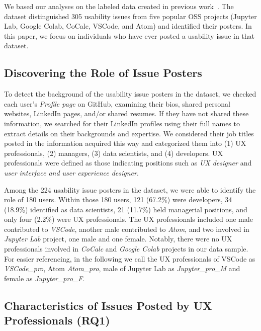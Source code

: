 We based our analyses on the labeled data created in previous work~\cite{sanei2023characterizing}. The dataset distinguished 305 usability issues from five popular OSS projects (Jupyter Lab,
Google Colab, CoCalc, VSCode, and Atom) and identified their posters. In this paper, we focus on individuals who have ever posted a usability issue in that dataset. 

\subsection{Discovering the Role of Issue Posters}\label{sec: Discovering_role}

To detect the background of the usability issue posters in the dataset, we checked each user's \textit{Profile page} on GitHub, examining their bios, shared personal websites, LinkedIn pages, and/or shared resumes. If they have not shared these information, we searched for their LinkedIn profiles using their full names to extract details on their backgrounds and expertise. We considered their job titles posted in the information acquired this way and categorized them into (1) UX professionals, (2) managers, (3) data scientists, and (4) developers. UX professionals were defined as those indicating positions such as \textit{UX designer} and \textit{user interface and user experience designer}.

Among the 224 usability issue posters in the dataset, we were able to identify the role of 180 users. Within those 180 users, 121 (67.2\%) were developers, 34 (18.9\%) identified as data scientists, 21 (11.7\%) held managerial positions, and only four (2.2\%) were UX professionals. The UX professionals included one male contributed to \textit{VSCode}, another male contributed to \textit{Atom}, and two involved in \textit{Jupyter Lab} project, one male and one female. Notably, there were no UX professionals involved in \textit{CoCalc} and \textit{Google Colab} projects in our data sample. For easier referencing, in the following we call the UX professionals of VSCode as \textit{VSCode\_pro}, Atom \textit{Atom\_pro}, male of Jupyter Lab as \textit{Jupyter\_pro\_M} and female as \textit{Jupyter\_pro\_F}.

\subsection{Characteristics of Issues Posted by UX Professionals (RQ1)}


